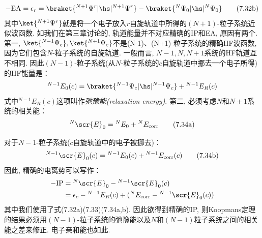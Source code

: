 \begin{align}
-\mathrm{EA} = \epsilon_r = \braket{^{N+1}\Psi^r|\hs| ^{N+1}\Psi^r} - \braket{^{N}\Psi_0|\hs|^{N}\Psi_0}\tag{7.32b}
\end{align}
其中$\ket{^{N+1}\Psi^r}$就是将一个电子放入$r$自旋轨道中所得的$(N+1)$-粒子系统近似波函数. 
如我们在第三章讨论的, 
轨道能量并不对应精确的IP和EA, 
原因有两个. 
第一,
$\ket{^{N-1}\Psi_c},\ket{^{N+1}\Psi_c}$不是(N-1)、(N+1)-粒子系统的精确HF波函数, 
因为它们包含$N$-粒子系统的自旋轨道. 
一般而言, 
$N-1,N,N+1$系统的HF轨道互不相同. 
因此$(N-1)$-粒子系统(从$N$-粒子系统的$c$自旋轨道中挪去一个电子所得)的HF能量是：
\begin{align}
{}^{N-1}E_0(c) = \braket{{}^{N-1}\Psi_c|\hs|{}^{N-1}\Psi_c} + {}^{N-1}E_R(c)
\end{align}
式中${}^{N-1}E_R(c)$这项叫作\emph{弛豫能(relaxation energy)}. 
第二, 
必须考虑$N$和$N\pm1$系统的相关能：
\begin{align}
{}^N\scr{E}_0 = {}^NE_0 + {}^NE_\mathrm{corr}\tag{7.34a}
\end{align}
\addtocounter{equation}{1}
对于$N-1$-粒子系统($c$自旋轨道中的电子被挪去)：
\begin{align}
{}^{N-1}\scr{E}_0(c) = {}^{N-1}E_0(c) + {}^{N-1}E_\mathrm{corr}(c)\tag{7.34b}
\end{align}
因此, 
精确的电离势可以写作：
\begin{align}
-\mathrm{IP} & = {}^N\scr{E}_0 - {}^{N-1}\scr{E}_0(c)\notag\\
             & = \epsilon_c - {}^{N-1}E_R(c) + ({}^NE_\mathrm{corr} - {}^{N-1}\scr{E}_0(c))
\end{align}
其中我们使用了式(7.32a)(7.33)(7.34a,b). 
因此欲得到精确的IP, 
则Koopmans定理的结果必须用$(N-1)$-粒子系统的弛豫能以及$N$和$(N-1)$粒子系统之间的相关能之差来修正. 
电子亲和能也如此. 

